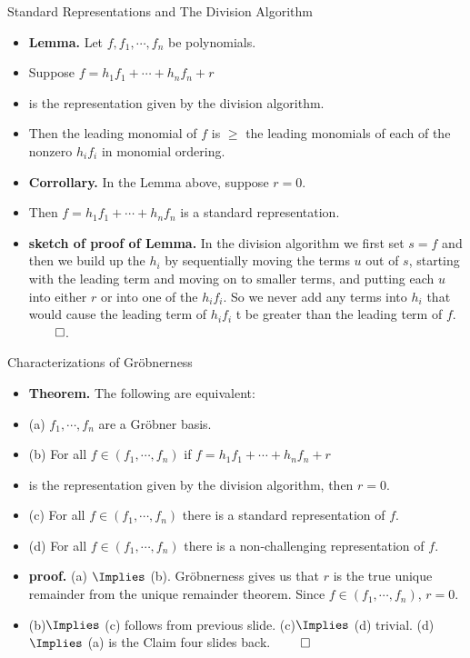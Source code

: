 \documentclass{beamer}
\begin{document}
\begin{frame}{Standard Representations and The Division Algorithm}

\begin{itemize}
  \item \textbf{Lemma.} Let $f, f_1,\cdots,f_n$ be polynomials.
  \item Suppose $f = h_1f_1 + \cdots + h_n f_n + r$
  \item is the representation given by the division algorithm.
  \item Then the leading monomial of $f$ is $\geq$ the leading
  monomials of each of the nonzero $h_i f_i$ in monomial ordering.
  \item \textbf{Corrollary.} In the Lemma above, suppose $r=0$.
  \item Then $f = h_1f_1 + \cdots + h_n f_n$ is a standard representation.
  \item \textbf{sketch of proof of Lemma.} In the division algorithm we first set $s=f$ and then we build
  up the $h_i$ by sequentially moving the terms $u$ out of $s$, starting with the leading term and moving on to smaller terms,
  and putting each $u$ into either $r$ or into one of the $h_i f_i$. So we never add any
  terms into $h_i$ that would cause the leading term of $h_i f_i$ t be greater than the leading term of $f$. $\qed$.
\end{itemize}
\end{frame}

\begin{frame}{Characterizations of Gr\"{o}bnerness}

\begin{itemize}
  \item \textbf{Theorem.} The following are equivalent:
  \item (a) $f_1,\cdots, f_n$ are a Gr\"{o}bner basis.
  \item (b) For all $f\in(f_1,\cdots, f_n)$ if $f = h_1f_1 + \cdots + h_n f_n + r$
  \item is the representation given by the division algorithm, then $r=0$.
  \item (c) For all $f\in(f_1,\cdots, f_n)$ there is a standard representation of $f$.
  \item (d) For all $f\in(f_1,\cdots, f_n)$ there is a non-challenging representation of $f$.
  \item \textbf{proof.} (a) $\Implies$ (b). Gr\"{o}bnerness gives us that $r$ is the
  true unique remainder from the unique remainder theorem. Since  $f\in(f_1,\cdots,f_n)$,
  $r=0$.
  \item (b)$\Implies$ (c) follows from previous slide. (c)$\Implies$ (d) trivial.
  (d)$\Implies$ (a) is the Claim four slides back. $\qed$
\end{itemize}
\end{frame}

\end{document}
